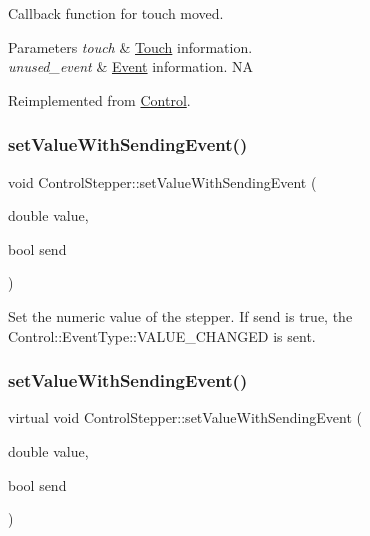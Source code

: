 Callback function for touch moved.


\begin{DoxyParams}{Parameters}
{\em touch} & \hyperlink{classTouch}{Touch} information. \\
\hline
{\em unused\+\_\+event} & \hyperlink{classEvent}{Event} information.  NA \\
\hline
\end{DoxyParams}


Reimplemented from \hyperlink{classControl_a26d2e6af053319dc605949678f726622}{Control}.

\mbox{\label{classControlStepper_ad71e9ce56be2a8e40d2c57e2866fbed2}} 
\subsubsection{\texorpdfstring{set\+Value\+With\+Sending\+Event()}{setValueWithSendingEvent()}\hspace{0.1cm}{\footnotesize\ttfamily [1/2]}}
{\footnotesize\ttfamily void Control\+Stepper\+::set\+Value\+With\+Sending\+Event (\begin{DoxyParamCaption}\item[{double}]{value,  }\item[{bool}]{send }\end{DoxyParamCaption})\hspace{0.3cm}{\ttfamily [virtual]}}

Set the numeric value of the stepper. If send is true, the Control\+::\+Event\+Type\+::\+V\+A\+L\+U\+E\+\_\+\+C\+H\+A\+N\+G\+ED is sent. \mbox{\label{classControlStepper_af591de86f70b05305db312475a367401}} 
\subsubsection{\texorpdfstring{set\+Value\+With\+Sending\+Event()}{setValueWithSendingEvent()}\hspace{0.1cm}{\footnotesize\ttfamily [2/2]}}
{\footnotesize\ttfamily virtual void Control\+Stepper\+::set\+Value\+With\+Sending\+Event (\begin{DoxyParamCaption}\item[{double}]{value,  }\item[{bool}]{send }\end{DoxyParamCaption})\hspace{0.3cm}{\ttfamily [virtual]}}

